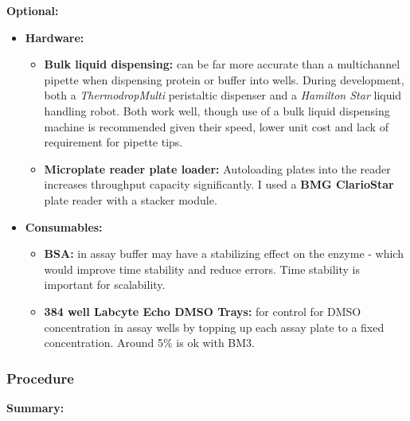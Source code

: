 \documentclass{article}
\begin{document}
\textbf{Optional:}
\begin{itemize}
	\item \textbf{Hardware:}
		\begin{itemize}
			\item \textbf{Bulk liquid dispensing:} can be far more accurate than a multichannel pipette when dispensing protein or buffer into wells.
			During development, both a \textit{ThermodropMulti} peristaltic dispenser and a \textit{Hamilton Star} liquid handling robot. 
			Both work well, though use of a bulk liquid dispensing machine is recommended given their speed, lower unit cost and lack of requirement for pipette tips.
			\item \textbf{Microplate reader plate loader:} Autoloading plates into the reader increases throughput capacity significantly.
			I used a \textbf{BMG ClarioStar} plate reader with a stacker module.
		\end{itemize}
	\item \textbf{Consumables:}
		\begin{itemize}
			\item \textbf{BSA:} in assay buffer may have a stabilizing effect on the enzyme - which would improve time stability and reduce errors.
			Time stability is important for scalability.
			\item \textbf{384 well Labcyte Echo DMSO Trays:} for control for DMSO concentration in assay wells by topping up each assay plate to a fixed concentration. 
			Around 5\% is ok with BM3.
		\end{itemize}
\end{itemize}

\subsubsection{Procedure}


\textbf{Summary:}
\end{document}
